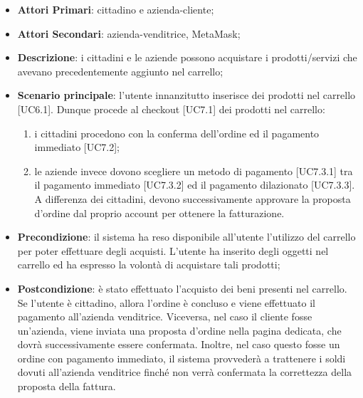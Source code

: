 \begin{itemize}
	\item \textbf{Attori Primari}: cittadino e azienda-cliente;
	\item \textbf{Attori Secondari}: azienda-venditrice, MetaMask\glo;
	\item \textbf{Descrizione}: i cittadini e le aziende possono acquistare i prodotti/servizi che avevano precedentemente aggiunto nel carrello;
	\item \textbf{Scenario principale}: l'utente innanzitutto inserisce dei prodotti nel carrello [UC6.1]. Dunque procede al checkout [UC7.1] dei prodotti nel carrello:
	\begin{enumerate}[label=\alph*.]
		\item i cittadini procedono con la conferma dell'ordine ed il pagamento immediato [UC7.2];
		\item le aziende invece dovono scegliere un metodo di pagamento [UC7.3.1] tra il pagamento immediato [UC7.3.2] ed il pagamento dilazionato [UC7.3.3]. A differenza dei cittadini, devono successivamente approvare la proposta d'ordine dal proprio account per ottenere la fatturazione.
	\end{enumerate}
	
	\item \textbf{Precondizione}: il sistema ha reso disponibile all'utente l'utilizzo del carrello per poter effettuare degli acquisti. L'utente ha inserito degli oggetti nel carrello ed ha espresso la volontà di acquistare tali prodotti;
	\item \textbf{Postcondizione}: è stato effettuato l'acquisto dei beni presenti nel carrello. Se l'utente è cittadino, allora l'ordine è concluso e viene effettuato il pagamento all'azienda venditrice. Viceversa, nel caso il cliente fosse un'azienda, viene inviata una proposta d'ordine nella pagina dedicata, che dovrà successivamente essere confermata. Inoltre, nel caso questo fosse un ordine con pagamento immediato, il sistema provvederà a trattenere i soldi dovuti all'azienda venditrice finché non verrà confermata la correttezza della proposta della fattura.
\end{itemize} 

